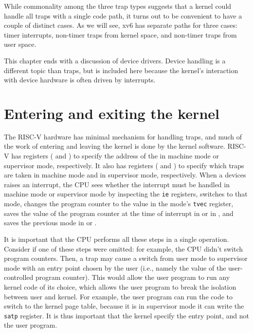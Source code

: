 While commonality among the three trap types suggests that a kernel
could handle all traps with a single code path, it turns out to be
convenient to have a couple of distinct cases. As we will see, xv6 has
separate paths for three cases: timer interrupts, non-timer traps from
kernel space, and non-timer traps from user space.

This chapter ends with a discussion of device drivers. Device handling
is a different topic than traps, but is included here because the
kernel's interaction with device hardware is often driven by
interrupts.

\section{Entering and exiting the kernel}

The RISC-V hardware has minimal mechanism for handling traps,
and much of the work of entering and leaving the kernel is done by the kernel
software.   RISC-V has registers ( and
) to specify the address of the  in machine mode or supervisor mode, respectively.
It also
has registers ( and ) to specify which
traps are taken in machine mode and in supervisor mode,
respectively.  When a devices raises an interrupt, the CPU sees
whether the interrupt must be handled in machine mode or supervisor
mode by inspecting the \lstinline{ie} registers, switches to that
mode, changes the program counter to the value in the mode's
\lstinline{tvec} register, saves the value of the program counter at
the time of interrupt in  or in , and
saves the previous mode in  or .

It is important that the CPU performs all these steps in a
single operation.  Consider if one of these steps were omitted: for
example, the CPU didn't switch program counters.  Then, a
trap may cause a switch from user mode to supervisor mode with an
entry point chosen by the user (i.e., namely the value of the
user-controlled program counter).  This would allow the user program
to run any kernel code of its choice, which allows the user program to
break the isolation between user and kernel. For example, the user
program can run the code to switch to the kernel page table, because
it is in supervisor mode it can write the \lstinline{satp} register.  It
is thus important that the kernel specify the entry point, and not the
user program.


